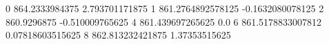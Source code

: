 0 864.2333984375 2.793701171875
1 861.2764892578125 -0.1632080078125
2 860.9296875 -0.510009765625
4 861.439697265625 0.0
6 861.5178833007812 0.07818603515625
8 862.813232421875 1.37353515625
